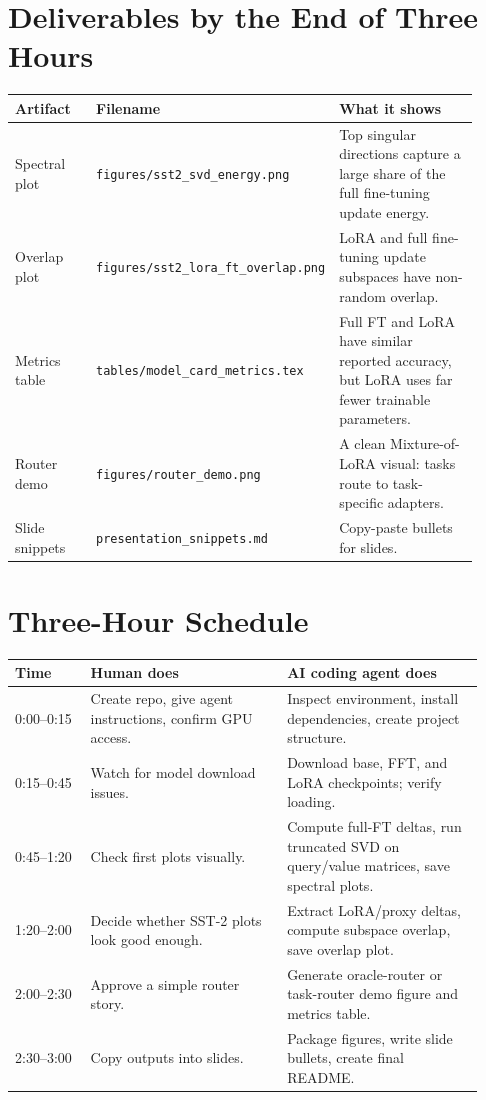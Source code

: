 \documentclass[11pt]{article}
\begin{document}
\section{Deliverables by the End of Three Hours}

\begin{longtable}{p{0.20\linewidth}p{0.30\linewidth}p{0.42\linewidth}}
\toprule
\textbf{Artifact} & \textbf{Filename} & \textbf{What it shows} \\
\midrule
Spectral plot & \texttt{figures/sst2\_svd\_energy.png} & Top singular directions capture a large share of the full fine-tuning update energy. \\
Overlap plot & \texttt{figures/sst2\_lora\_ft\_overlap.png} & LoRA and full fine-tuning update subspaces have non-random overlap. \\
Metrics table & \texttt{tables/model\_card\_metrics.tex} & Full FT and LoRA have similar reported accuracy, but LoRA uses far fewer trainable parameters. \\
Router demo & \texttt{figures/router\_demo.png} & A clean Mixture-of-LoRA visual: tasks route to task-specific adapters. \\
Slide snippets & \texttt{presentation\_snippets.md} & Copy-paste bullets for slides. \\
\bottomrule
\end{longtable}

\section{Three-Hour Schedule}

\begin{longtable}{p{0.15\linewidth}p{0.39\linewidth}p{0.39\linewidth}}
\toprule
\textbf{Time} & \textbf{Human does} & \textbf{AI coding agent does} \\
\midrule
0:00--0:15 & Create repo, give agent instructions, confirm GPU access. & Inspect environment, install dependencies, create project structure. \\
0:15--0:45 & Watch for model download issues. & Download base, FFT, and LoRA checkpoints; verify loading. \\
0:45--1:20 & Check first plots visually. & Compute full-FT deltas, run truncated SVD on query/value matrices, save spectral plots. \\
1:20--2:00 & Decide whether SST-2 plots look good enough. & Extract LoRA/proxy deltas, compute subspace overlap, save overlap plot. \\
2:00--2:30 & Approve a simple router story. & Generate oracle-router or task-router demo figure and metrics table. \\
2:30--3:00 & Copy outputs into slides. & Package figures, write slide bullets, create final README. \\
\bottomrule
\end{longtable}
\end{document}
